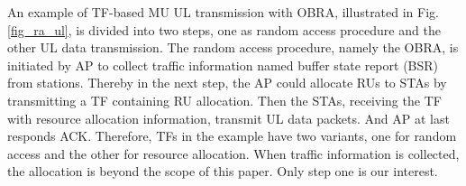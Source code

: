 \documentclass[journal]{IEEEtran}
\begin{document}

An example of TF-based MU UL transmission with OBRA, illustrated in Fig. \ref{fig_ra_ul}, is divided into two steps, one as random access procedure and the other UL data transmission.
The random access procedure, namely the OBRA, is initiated by AP to collect traffic information named buffer state report (BSR) from stations. 
Thereby in the next step, the AP could allocate RUs to STAs by transmitting a TF containing RU allocation.
Then the STAs, receiving the TF with resource allocation information, transmit UL data packets. And AP at last responds ACK.
Therefore, TFs in the example have two variants, one for random access and the other for resource allocation. 
When traffic information is collected, the allocation is beyond the scope of this paper. Only step one is our interest.
\end{document}
